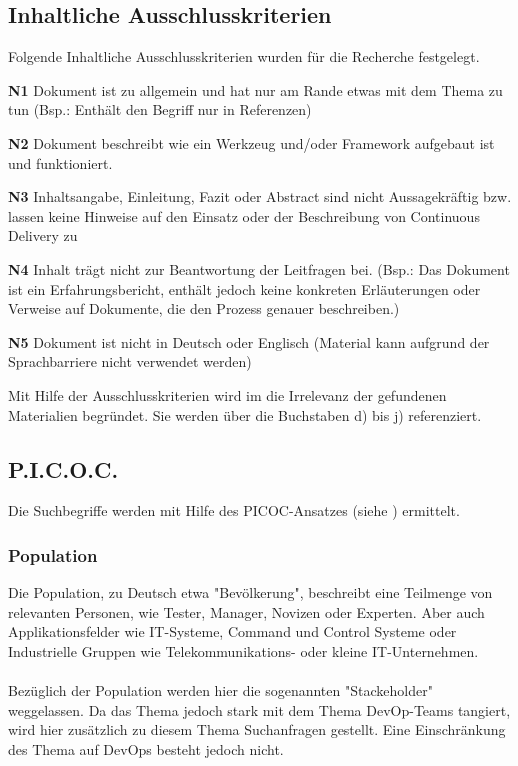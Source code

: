 \subsection{Inhaltliche Ausschlusskriterien}
\label{subsec:inhaltlicheAusschlusskriterien}
Folgende Inhaltliche Ausschlusskriterien wurden für die Recherche festgelegt.
\begin{list}{label}{spacing}
	\item[\textbf{N1}] Dokument ist zu allgemein und hat nur am Rande etwas mit dem Thema zu tun (Bsp.: Enthält den Begriff nur in Referenzen)
	\item[\textbf{N2}] Dokument beschreibt wie ein Werkzeug und/oder Framework aufgebaut ist und funktioniert.
	\item[\textbf{N3}] Inhaltsangabe, Einleitung, Fazit oder Abstract sind nicht Aussagekräftig bzw. lassen keine Hinweise auf den Einsatz oder der Beschreibung von Continuous Delivery zu
	\item[\textbf{N4}] Inhalt trägt nicht zur Beantwortung der Leitfragen bei. (Bsp.: Das Dokument ist ein Erfahrungsbericht, enthält jedoch keine konkreten Erläuterungen oder Verweise auf Dokumente, die den Prozess genauer beschreiben.)
	\item[\textbf{N5}] Dokument ist nicht in Deutsch oder Englisch (Material kann aufgrund der Sprachbarriere nicht verwendet werden)
\end{list}
Mit Hilfe der Ausschlusskriterien wird im  die Irrelevanz der gefundenen Materialien begründet. Sie werden über die Buchstaben d) bis j) referenziert.

\subsection{P.I.C.O.C.}
\label{subsec:picoc}
Die Suchbegriffe werden mit Hilfe des PICOC-Ansatzes (siehe \cite{Kitchenham2007}) ermittelt.

\subsubsection*{Population}
\label{picoc:population}
Die Population, zu Deutsch etwa "Bevölkerung", beschreibt eine Teilmenge von relevanten Personen, wie Tester, Manager, Novizen oder Experten. Aber auch Applikationsfelder wie IT-Systeme, Command und Control Systeme oder Industrielle Gruppen wie Telekommunikations- oder kleine IT-Unternehmen.
\\\\
Bezüglich der Population werden hier die sogenannten "Stackeholder" weggelassen. Da das Thema jedoch stark mit dem Thema DevOp-Teams tangiert, wird hier zusätzlich zu diesem Thema Suchanfragen gestellt. Eine Einschränkung des Thema auf DevOps besteht jedoch nicht.

